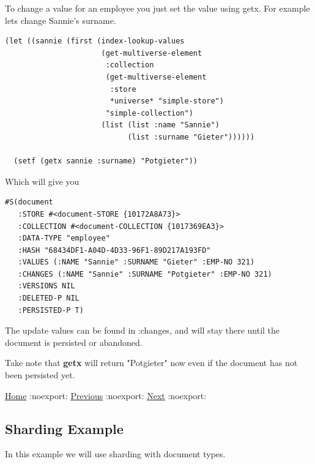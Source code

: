 \documentclass[11pt]{article}
\begin{document}
To change a value for an employee you just set the value using
getx. For example lets change Sannie's surname.

\begin{verbatim}
(let ((sannie (first (index-lookup-values
                      (get-multiverse-element
                       :collection
                       (get-multiverse-element
                        :store
                        *universe* "simple-store")
                       "simple-collection")
                      (list (list :name "Sannie")
                            (list :surname "Gieter"))))))

  (setf (getx sannie :surname) "Potgieter"))
\end{verbatim}

Which will give you

\begin{verbatim}
#S(document
   :STORE #<document-STORE {10172A8A73}>
   :COLLECTION #<document-COLLECTION {1017369EA3}>
   :DATA-TYPE "employee"
   :HASH "68434DF1-A04D-4D33-96F1-89D217A193FD"
   :VALUES (:NAME "Sannie" :SURNAME "Gieter" :EMP-NO 321)
   :CHANGES (:NAME "Sannie" :SURNAME "Potgieter" :EMP-NO 321)
   :VERSIONS NIL
   :DELETED-P NIL
   :PERSISTED-P T)
\end{verbatim}

The update values can be found in :changes, and will stay there until
the document is persisted or abandoned.

Take note that \textbf{\textbf{getx}} will return "Potgieter" now even if the
document has not been persisted yet.

\href{home.org}{Home} :noexport: \href{indexed-example.org}{Previous} :noexport: \href{sharding-example.org}{Next} :noexport:
\subsection{Sharding Example}
\label{sec:org6790baf}

In this example we will use sharding with document types.
\end{document}
